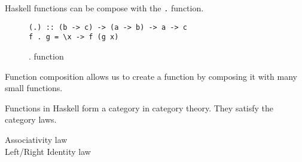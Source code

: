 \documentclass[twoside, a4paper]{article}
\begin{document}
Haskell functions can be compose with the \verb|.| function.

\begin{figure}
  \centering
\begin{verbatim}
(.) :: (b -> c) -> (a -> b) -> a -> c
f . g = \x -> f (g x)
\end{verbatim}
  \caption{. function}
  \label{fig:compositionfunction}
\end{figure}

Function composition allows us to create a function by composing it with many small functions. 

Functions in Haskell form a category in category theory. They satisfy the category laws.
\begin{description}
\item[Associativity law] 
\item[Left/Right Identity law] 
\end{description}



\end{document}
